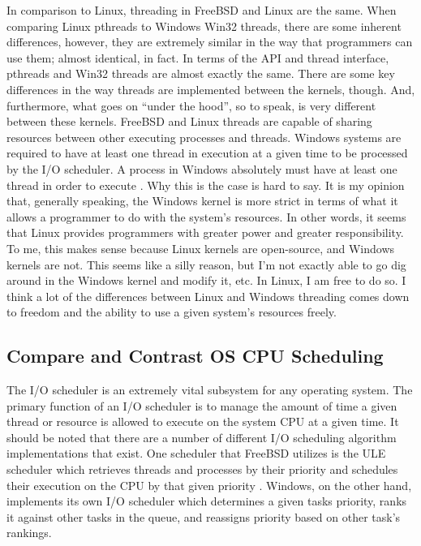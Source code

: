 \documentclass[onecolumn, draftclsnofoot,10pt, compsoc]{IEEEtran}
\begin{document}
\noindent In comparison to Linux, threading in FreeBSD and Linux are the same. When comparing Linux pthreads to Windows Win32 threads, there are some inherent differences, however, they are extremely similar in the way that programmers can use them; almost identical, in fact. In terms of the API and thread interface, pthreads and Win32 threads are almost exactly the same. There are some key differences in the way threads are implemented between the kernels, though. And, furthermore, what goes on “under the hood”, so to speak, is very different between these kernels. FreeBSD and Linux threads are capable of sharing resources between other executing processes and threads. Windows systems are required to have at least one thread in execution at a given time to be processed by the I/O scheduler. A process in Windows absolutely must have at least one thread in order to execute \cite{MSWindows1PTCS}. Why this is the case is hard to say. It is my opinion that, generally speaking, the Windows kernel is more strict in terms of what it allows a programmer to do with the system’s resources. In other words, it seems that Linux provides programmers with greater power and greater responsibility. To me, this makes sense because Linux kernels are open-source, and Windows kernels are not. This seems like a silly reason, but I’m not exactly able to go dig around in the Windows kernel and modify it, etc. In Linux, I am free to do so. I think a lot of the differences between Linux and Windows threading comes down to freedom and the ability to use a given system’s resources freely.\\

\subsection{Compare and Contrast OS CPU Scheduling}
\noindent The I/O scheduler is an extremely vital subsystem for any operating system. The primary function of an I/O scheduler is to manage the amount of time a given thread or resource is allowed to execute on the system CPU at a given time. It should be noted that there are a number of different I/O scheduling algorithm implementations that exist. One scheduler that FreeBSD utilizes is the ULE scheduler which retrieves threads and processes by their priority and schedules their execution on the CPU by that given priority \cite{FreeBSD1PTCS}. Windows, on the other hand, implements its own I/O scheduler which determines a given tasks priority, ranks it against other tasks in the queue, and reassigns priority based on other task’s rankings.\\
\end{document}

